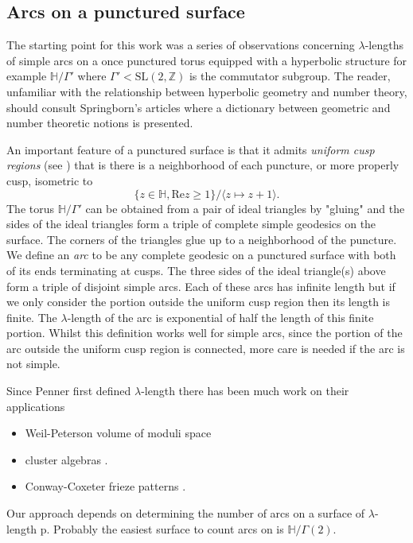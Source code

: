 \documentclass[12pt,a4paper]{amsart}
\def\HH{\mathbb{H}}
\def\g2{\Gamma(2)}
\def\xx{\HH/\g2}
\def\ZZ{\mathbb{Z}}
\def\sl2{\mathrm{SL}(2, \ZZ)}
\begin{document}
\subsection{Arcs on a punctured surface}

The starting point for this work was a series of observations
concerning $\lambda$-lengths of simple arcs on a once punctured
torus equipped with a hyperbolic structure for example $\HH/\Gamma'$
where $\Gamma' < \sl2$ is the commutator subgroup. 
The reader, unfamiliar with the relationship between hyperbolic
geometry and number theory,
should consult Springborn's articles \cite{springborn1, springborn2}
where a dictionary between geometric and number theoretic notions is presented.

An important
feature of a punctured surface is that it admits \textit{uniform
cusp regions} (see \cite{Shimizu}) that is there is a neighborhood of each puncture, or more properly cusp, isometric to 
$$\{z\in \mathbb{H}, \mathrm{Re}z \geq 1\}/\langle z \mapsto z+1
\rangle.$$  
The  torus $\mathbb{H}/\Gamma'$ can
be obtained from a pair of ideal triangles by "gluing" and the sides
of the ideal triangles form a triple of complete simple geodesics on
the surface. The corners of the triangles glue up to a neighborhood
of the puncture. We define an \textit{arc} to
be any complete geodesic on a punctured surface with both of its
ends terminating at cusps. The three sides of the ideal triangle(s)
above form a triple of disjoint simple arcs. Each of these arcs has
infinite length but if we only consider the portion outside the
uniform cusp region then its length is finite. The $\lambda$-length
of the arc is exponential of half the length of this finite portion.
Whilst this definition works well for simple arcs, since the portion of
the arc
outside the uniform cusp region is connected, more care is needed if
the arc is not simple.

Since Penner first defined $\lambda$-length 
there has been much work on their applications

\begin{itemize}
	\item Weil-Peterson volume of moduli space \cite{bob}
	\item cluster algebras \cite{Fomin}.
	\item Conway-Coxeter frieze patterns \cite{frieze}.
\end{itemize}
Our approach depends on determining the number of arcs on a surface
of $\lambda$-length p.
Probably the easiest surface to count arcs on is $\xx$.
\end{document}
